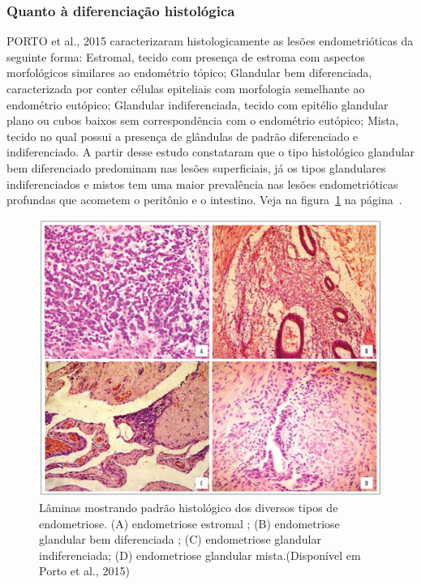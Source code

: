 \documentclass[12pt]{article} %
\begin{document}
\subsubsection{Quanto à diferenciação histológica}

PORTO et al., 2015 caracterizaram histologicamente as lesões
endometrióticas da seguinte forma: Estromal, tecido com presença de
estroma com aspectos morfológicos similares ao endométrio tópico;
Glandular bem diferenciada, caracterizada por conter células
epiteliais com morfologia semelhante ao endométrio eutópico; Glandular
indiferenciada, tecido com epitélio glandular plano ou cubos baixos
sem correspondência com o endométrio eutópico; Mista, tecido no qual
possui a presença de glândulas de padrão diferenciado e
indiferenciado. A partir desse estudo constataram que o tipo
histológico glandular bem diferenciado predominam nas lesões
superficiais, já os tipos glandulares indiferenciados e mistos tem uma
maior prevalência nas lesões endometrióticas profundas que acometem o
peritônio e o intestino. Veja na figura~\ref{histologico} na
página~\pageref{histologico}.


\begin{figure}[h!]
\centering
\includegraphics[width=16cm]{citoendometriose1636.jpg}
\caption[Amostras histológicas de diversos tipos de endometriose]{Lâminas mostrando padrão histológico dos diversos tipos de endometriose. (A) endometriose estromal ; (B) endometriose glandular bem diferenciada ; (C) endometriose glandular indiferenciada; (D) endometriose glandular mista.(Disponível em Porto et al., 2015)}
\label{histologico}
\end{figure} 
\end{document}
